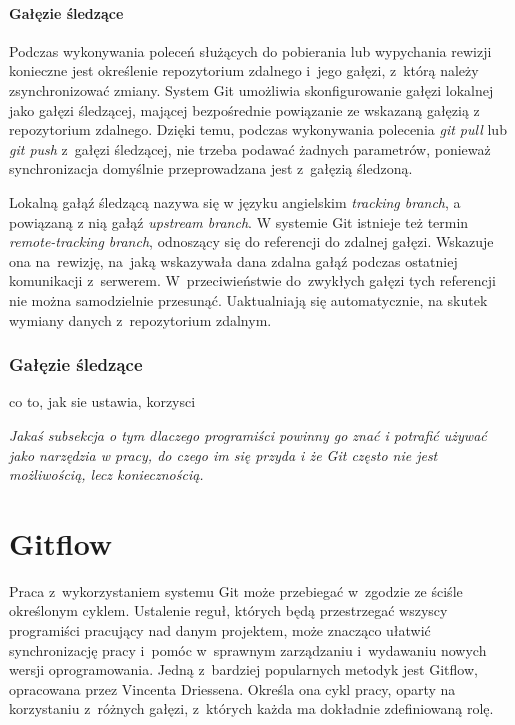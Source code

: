 \documentclass[12pt,a4paper,polish,thesis]{dcsbook}
\begin{document}
{	\paragraph{Gałęzie śledzące}
	Podczas wykonywania poleceń służących do pobierania lub wypychania rewizji konieczne jest określenie repozytorium zdalnego i~jego gałęzi, z~którą należy zsynchronizować zmiany. System Git umożliwia skonfigurowanie gałęzi lokalnej jako gałęzi śledzącej, mającej bezpośrednie powiązanie ze wskazaną gałęzią z repozytorium zdalnego. Dzięki temu, podczas wykonywania polecenia \textit{git pull} lub \textit{git push} z~gałęzi śledzącej, nie trzeba podawać żadnych parametrów, ponieważ synchronizacja domyślnie przeprowadzana jest z~gałęzią śledzoną.

	Lokalną gałąź śledzącą nazywa się w języku angielskim \textit{tracking branch}, a powiązaną z nią gałąź \textit{upstream branch}. W systemie Git istnieje też termin \textit{remote-tracking branch}, odnoszący się do referencji do zdalnej gałęzi. Wskazuje ona na~rewizję, na~jaką wskazywała dana zdalna gałąź podczas ostatniej komunikacji z~serwerem. W~przeciwieństwie do~zwykłych gałęzi tych referencji nie można samodzielnie przesunąć. Uaktualniają się automatycznie, na skutek wymiany danych z~repozytorium zdalnym.

	\subsubsection{Gałęzie śledzące}
	co to, jak sie ustawia, korzysci


	\textit{Jakaś subsekcja o tym dlaczego programiści powinny go znać i potrafić używać jako narzędzia w pracy, do czego im się przyda i że Git często nie jest możliwością, lecz koniecznością.}

	\section{Gitflow}

	Praca z~wykorzystaniem systemu Git może przebiegać w~zgodzie ze ściśle określonym cyklem. Ustalenie reguł, których będą przestrzegać wszyscy programiści pracujący nad danym projektem, może znacząco ułatwić synchronizację pracy i~pomóc w~sprawnym zarządzaniu i~wydawaniu nowych wersji oprogramowania. Jedną z~bardziej popularnych metodyk jest Gitflow, opracowana przez Vincenta Driessena. Określa ona cykl pracy, oparty na korzystaniu z~różnych gałęzi, z~których każda ma dokładnie zdefiniowaną rolę.

}
\end{document}
